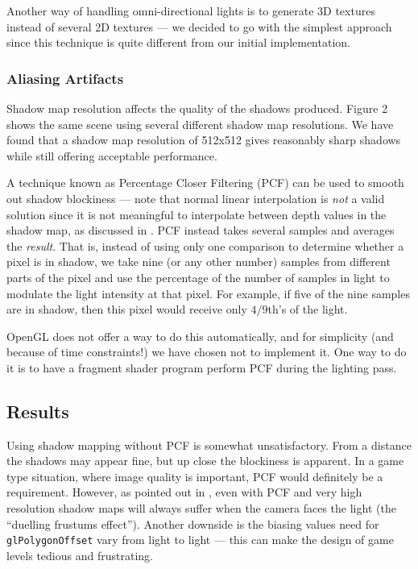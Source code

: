 \documentclass{llncs}
\begin{document}
\begin{multicols}{2}
{Another way of handling omni-directional lights is to generate 3D textures
instead of several 2D textures --- we decided to go with the simplest approach since
this technique is quite different from our initial implementation. 

\subsubsection{Aliasing Artifacts} Shadow map resolution affects the quality of 
the shadows produced.  Figure 2 shows the same scene using several different
shadow map resolutions.  We have found that a shadow map resolution of 
512x512 gives reasonably sharp shadows while still offering acceptable performance.

A technique known as Percentage Closer Filtering (PCF) can be used to smooth
out shadow blockiness --- note that normal linear interpolation is \textit{not} a valid
solution since it is not meaningful to interpolate between depth values
in the shadow map, as discussed in \cite{nvidia}.  PCF instead takes several
samples and averages the \textit{result}.  That is, instead of using only one
comparison to determine whether a pixel is in shadow, we take nine (or any other
number) samples from different parts of the pixel and use the percentage of the number of 
samples in light to modulate the light intensity at that pixel.  For example, if five of 
the nine samples are in shadow, then this pixel would receive only $4/9$th's of the light. 

OpenGL does not offer a way to do this automatically, and for simplicity (and because of
time constraints!) we have chosen not to implement it.  One way to do it is to have a fragment 
shader program perform PCF during the lighting pass. 

\subsection{Results} Using shadow mapping without PCF is somewhat unsatisfactory. 
From a distance the shadows may appear fine, but up close the blockiness is apparent.  In a 
game type situation, where image quality is important, PCF would definitely be a requirement.
However, as pointed out in \cite{nvidiea}, even with PCF and very high resolution shadow
maps will always suffer when the camera faces the light (the ``duelling frustums effect''). 
Another downside is the biasing values need for {\tt glPolygonOffset} vary from light
to light --- this can make the design of game levels tedious and frustrating. 

}
\end{multicols}
\end{document}
